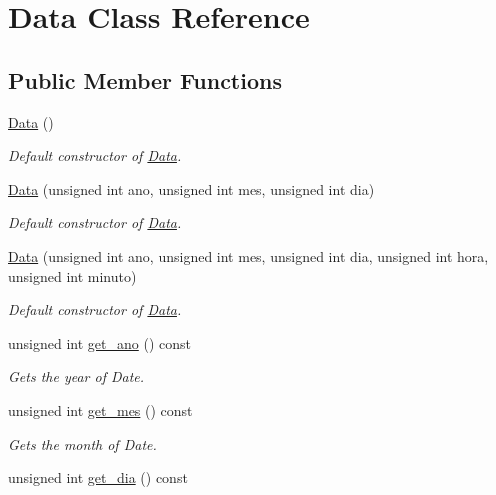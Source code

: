 \hypertarget{class_data}{}\section{Data Class Reference}
\label{class_data}
\subsection*{Public Member Functions}
\begin{DoxyCompactItemize}
\item 
\mbox{\label{class_data_af11f741cb7f587e2e495452a8905a22a}} 
\hyperlink{class_data_af11f741cb7f587e2e495452a8905a22a}{Data} ()
\begin{DoxyCompactList}\small\item\em Default constructor of \hyperlink{class_data}{Data}. \end{DoxyCompactList}\item 
\hyperlink{class_data_a2d45e272eb3ff0783c1603ddf7a44569}{Data} (unsigned int ano, unsigned int mes, unsigned int dia)
\begin{DoxyCompactList}\small\item\em Default constructor of \hyperlink{class_data}{Data}. \end{DoxyCompactList}\item 
\hyperlink{class_data_aac6e1806bfebec8a6060b4669b2bcf23}{Data} (unsigned int ano, unsigned int mes, unsigned int dia, unsigned int hora, unsigned int minuto)
\begin{DoxyCompactList}\small\item\em Default constructor of \hyperlink{class_data}{Data}. \end{DoxyCompactList}\item 
unsigned int \hyperlink{class_data_a8bdef64f9f2a512ee4d8b8322f03fb20}{get\+\_\+ano} () const
\begin{DoxyCompactList}\small\item\em Gets the year of Date. \end{DoxyCompactList}\item 
unsigned int \hyperlink{class_data_a2e3b1f959cbd56f06b778f5b1f86ddfa}{get\+\_\+mes} () const
\begin{DoxyCompactList}\small\item\em Gets the month of Date. \end{DoxyCompactList}\item 
unsigned int \hyperlink{class_data_abe48e8942184962a9b299f1a38533d3e}{get\+\_\+dia} () const

\end{DoxyCompactItemize}
